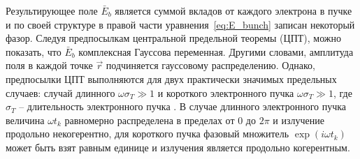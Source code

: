 Результирующее поле $\bar{E}_{b}$ является суммой вкладов от каждого электрона в пучке и по своей структуре в правой части уравнения~\ref{eq:E_bunch} записан некоторый фазор. Следуя предпосылкам центральной предельной теоремы (ЦПТ), можно показать, что $\bar{E}_{b}$ комплексная Гауссова переменная. Другими словами, амплитуда поля в каждой точке $\vec{r}$ подчиняется гауссовому распределению. Однако, предпосылки ЦПТ выполняются для двух практически значимых предельных случаев: случай длинного $\omega\sigma_T \gg 1$ и короткого электронного пучка $\omega\sigma_T \gg 1$, где $\sigma_T$ -- длительность электронного пучка . В случае длинного электронного пучка величина $\omega t_k$ равномерно распределена в пределах от $0$ до $2\pi$ и излучение продольно некогерентно, для короткого пучка фазовый множитель $\exp{(i \omega t_k)}$ может быть взят равным единице и излучения является продольно когерентным. 

